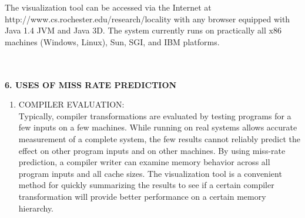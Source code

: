 \documentclass[14pt]{article}
\begin{document}
The visualization tool can be accessed via the Internet at http://www.cs.rochester.edu/research/locality with any browser equipped with Java 1.4 JVM and Java 3D. The system currently runs on practically all x86 machines (Windows, Linux), Sun, SGI, and IBM platforms.
\\\\\\
\begin{center}
\textbf{6. USES OF MISS RATE PREDICTION}\\
\end{center}
\begin{enumerate}
\item COMPILER EVALUATION:\\
Typically, compiler transformations are evaluated by testing programs for a few inputs on a few machines. While running on real systems allows accurate measurement of a complete system, the few results cannot reliably predict the effect on other program inputs and on other machines. By using miss-rate prediction, a compiler writer can examine memory behavior across all program inputs and all cache sizes. The visualization tool is a convenient method for quickly summarizing the results to see if a certain compiler transformation will provide better performance on a certain memory hierarchy.


\end{enumerate}
\end{document}
